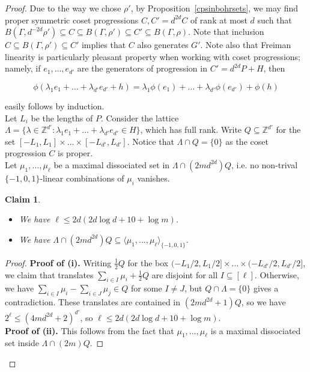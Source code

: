 \documentclass[a4paper,11pt]{article}
\numberwithin{theorem}{section}
\newtheorem{claim}[theorem]{Claim}
\theoremstyle{definition}
\begin{document}
\begin{proof}
    Due to the way we chose $\rho'$, by Proposition~\ref{cpsinbohrsets}, we may find proper symmetric coset progressions $C, C' = d^{2d} C$ of rank at most $d$ such that $B(\Gamma, d^{-2d}\rho') \subseteq C\subseteq B(\Gamma, \rho') \subseteq C' \subseteq B(\Gamma, \rho)$. Note that inclusion $C\subseteq B(\Gamma, \rho') \subseteq C'$ implies that $C$ also generates $G'$. Note also that Freiman linearity is particularly pleasant property when working with coset progressions; namely, if $e_1, \dots, e_{d'}$ are the generators of progression in $C' = d^{2d}P + H$, then 
    
    \begin{equation}\label{iteratedFreimanLinCP}\phi(\lambda_1 e_1 + \dots + \lambda_{d'} e_{d'} + h) = \lambda_1\phi(e_1) + \dots + \lambda_{d'}\phi(e_{d'}) + \phi(h)\end{equation}
    
    easily follows by induction.\\

    Let $L_i$ be the lengths of $P$. Consider the lattice $\Lambda = \{\lambda \in \mathbb{Z}^{d'} : \lambda_1 e_1 + \dots + \lambda_{d'} e_{d'} \in H\}$, which has full rank. Write $Q \subseteq \mathbb{Z}^{d'}$ for the set $[-L_1, L_1 ] \times \dots \times [-L_{d'}, L_{d'}]$. Notice that $\Lambda \cap Q = \{0\}$ as the coset progression $C$ is proper.\\
    
    \indent Let $\mu_1, \dots, \mu_\ell$ be a maximal dissociated set in $\Lambda \cap (2md^{2d})Q$, i.e. no non-trival $\{-1,0,1\}$-linear combinations of $\mu_i$ vanishes. 

    \begin{claim}
        \begin{itemize}
            \item[\textbf{(i)}] We have $\ell \leq  2d (2d \log d + 10 + \log m)$.
            \item[\textbf{(ii)}] We have $\Lambda \cap (2md^{2d})Q \subseteq \langle \mu_1, \dots, \mu_\ell\rangle_{\{-1,0,1\}}$.
        \end{itemize}
    \end{claim}

    \begin{proof}
        \textbf{Proof of (i).} Writing $\frac{1}{2}Q$ for the box $(-L_1/2, L_1/2] \times \dots \times (-L_{d'}/2, L_{d'}/2]$, we claim that translates $\sum_{i \in I} \mu_i + \frac{1}{2}Q$ are disjoint for all $I \subseteq [\ell]$. Otherwise, we have $\sum_{i \in I} \mu_i - \sum_{i \in J} \mu_j \in Q$ for some $I\not=J$, but $Q \cap \Lambda = \{0\}$ gives a contradiction. These translates are contained in $(2m d^{2d}+ 1)Q$, so we have $2^\ell \leq (4md^{2d} + 2)^{d'}$, so $\ell \leq 2d (2d \log d + 10 + \log m)$.\\
        \textbf{Proof of (ii).} This follows from the fact that $\mu_1, \dots, \mu_\ell$ is a maximal dissociated set inside $\Lambda \cap (2m)Q$.
    \end{proof}
    

\end{proof}
\end{document}
